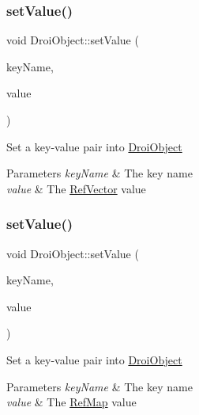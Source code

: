 \subsubsection{\texorpdfstring{set\+Value()}{setValue()}\hspace{0.1cm}{\footnotesize\ttfamily [8/11]}}
{\footnotesize\ttfamily void Droi\+Object\+::set\+Value (\begin{DoxyParamCaption}\item[{const string \&}]{key\+Name,  }\item[{const \hyperlink{class_ref_vector}{Ref\+Vector} \&}]{value }\end{DoxyParamCaption})}

Set a key-\/value pair into \hyperlink{class_droi_object}{Droi\+Object} 
\begin{DoxyParams}{Parameters}
{\em key\+Name} & The key name \\
\hline
{\em value} & The \hyperlink{class_ref_vector}{Ref\+Vector} value \\
\hline
\end{DoxyParams}
\mbox{\label{class_droi_object_a9f08b9842d8e1c6e0917ab7e9e307fb7}} 
\subsubsection{\texorpdfstring{set\+Value()}{setValue()}\hspace{0.1cm}{\footnotesize\ttfamily [9/11]}}
{\footnotesize\ttfamily void Droi\+Object\+::set\+Value (\begin{DoxyParamCaption}\item[{const string \&}]{key\+Name,  }\item[{const \hyperlink{class_ref_map}{Ref\+Map} \&}]{value }\end{DoxyParamCaption})}

Set a key-\/value pair into \hyperlink{class_droi_object}{Droi\+Object} 
\begin{DoxyParams}{Parameters}
{\em key\+Name} & The key name \\
\hline
{\em value} & The \hyperlink{class_ref_map}{Ref\+Map} value \\
\hline
\end{DoxyParams}
\mbox{\label{class_droi_object_a2401d9db2e15cedb2494e027c9faf6c7}} 
